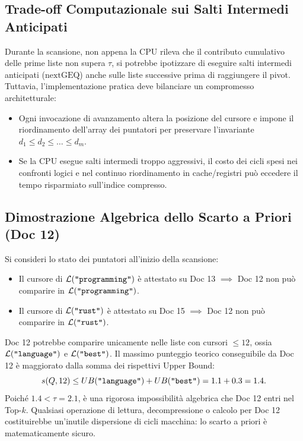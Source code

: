 \FloatBarrier
\subsection{Trade-off Computazionale sui Salti Intermedi Anticipati}
Durante la scansione, non appena la CPU rileva che il contributo cumulativo delle prime liste non supera $\tau$, si potrebbe ipotizzare di eseguire salti intermedi anticipati ($\text{nextGEQ}$) anche sulle liste successive prima di raggiungere il pivot.  
Tuttavia, l'implementazione pratica deve bilanciare un compromesso architetturale:
\begin{itemize}
    \item Ogni invocazione di avanzamento altera la posizione del cursore e impone il riordinamento dell'array dei puntatori per preservare l'invariante $d_1 \le d_2 \le \dots \le d_m$.
    \item Se la CPU esegue salti intermedi troppo aggressivi, il costo dei cicli spesi nei confronti logici e nel continuo riordinamento in cache/registri pu\`o eccedere il tempo risparmiato sull'indice compresso.
\end{itemize}

\FloatBarrier
\subsection{Dimostrazione Algebrica dello Scarto a Priori (Doc 12)}
Si consideri lo stato dei puntatori all'inizio della scansione:
\begin{itemize}
    \item Il cursore di $\mathcal{L}(\text{\texttt{"programming"}})$ \`e attestato su Doc 13 $\implies$ Doc 12 non pu\`o comparire in $\mathcal{L}(\text{\texttt{"programming"}})$.
    \item Il cursore di $\mathcal{L}(\text{\texttt{"rust"}})$ \`e attestato su Doc 15 $\implies$ Doc 12 non pu\`o comparire in $\mathcal{L}(\text{\texttt{"rust"}})$.
\end{itemize}
Doc 12 potrebbe comparire unicamente nelle liste con cursori $\le 12$, ossia $\mathcal{L}(\text{\texttt{"language"}})$ e $\mathcal{L}(\text{\texttt{"best"}})$.  
Il massimo punteggio teorico conseguibile da Doc 12 \`e maggiorato dalla somma dei rispettivi Upper Bound:
\begin{equation}
    s(Q, 12) \le UB(\text{\texttt{"language"}}) + UB(\text{\texttt{"best"}}) = 1.1 + 0.3 = 1.4.
\end{equation}
Poich\'e $1.4 < \tau = 2.1$, \`e una rigorosa impossibilit\`a algebrica che Doc 12 entri nel Top-$k$. Qualsiasi operazione di lettura, decompressione o calcolo per Doc 12 costituirebbe un'inutile dispersione di cicli macchina: lo scarto a priori \`e matematicamente sicuro.

